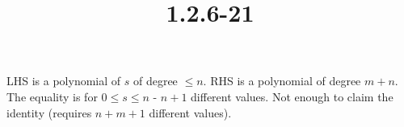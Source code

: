 \documentclass{article}
\title{1.2.6-21}
\begin{document}
\maketitle

LHS is a polynomial of $s$ of degree $\leq n$. RHS is a polynomial of degree $m + n$. The equality is for $0 \leq s \leq n$ - $n + 1$ different values. Not enough to claim the identity (requires $n + m + 1$ different values).
\end{document}
